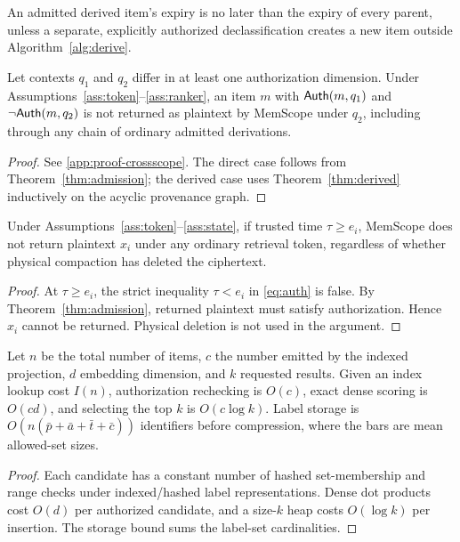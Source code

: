 \begin{corollary}
\label{cor:expiry-inherit}
An admitted derived item's expiry is no later than the expiry of every parent, unless a separate, explicitly authorized declassification creates a new item outside Algorithm~\ref{alg:derive}.
\end{corollary}

\begin{theorem}
\label{thm:crossscope}
Let contexts $q_1$ and $q_2$ differ in at least one authorization dimension. Under Assumptions~\ref{ass:token}--\ref{ass:ranker}, an item $m$ with $\mathsf{Auth}(m,q_1)$ and $\neg\mathsf{Auth}(m,q_2)$ is not returned as plaintext by MemScope under $q_2$, including through any chain of ordinary admitted derivations.
\end{theorem}
\begin{proof}
See \cref{app:proof-crossscope}. The direct case follows from Theorem~\ref{thm:admission}; the derived case uses Theorem~\ref{thm:derived} inductively on the acyclic provenance graph.
\end{proof}

\begin{theorem}
\label{thm:expiry}
Under Assumptions~\ref{ass:token}--\ref{ass:state}, if trusted time $\tau\ge e_i$, MemScope does not return plaintext $x_i$ under any ordinary retrieval token, regardless of whether physical compaction has deleted the ciphertext.
\end{theorem}
\begin{proof}
At $\tau\ge e_i$, the strict inequality $\tau<e_i$ in \cref{eq:auth} is false. By Theorem~\ref{thm:admission}, returned plaintext must satisfy authorization. Hence $x_i$ cannot be returned. Physical deletion is not used in the argument.
\end{proof}

\begin{proposition}
\label{prop:complexity}
Let $n$ be the total number of items, $c$ the number emitted by the indexed projection, $d$ embedding dimension, and $k$ requested results. Given an index lookup cost $I(n)$, authorization rechecking is $O(c)$, exact dense scoring is $O(cd)$, and selecting the top $k$ is $O(c\log k)$. Label storage is $O(n(\bar p+\bar a+\bar t+\bar c))$ identifiers before compression, where the bars are mean allowed-set sizes.
\end{proposition}
\begin{proof}
Each candidate has a constant number of hashed set-membership and range checks under indexed/hashed label representations. Dense dot products cost $O(d)$ per authorized candidate, and a size-$k$ heap costs $O(\log k)$ per insertion. The storage bound sums the label-set cardinalities.
\end{proof}

